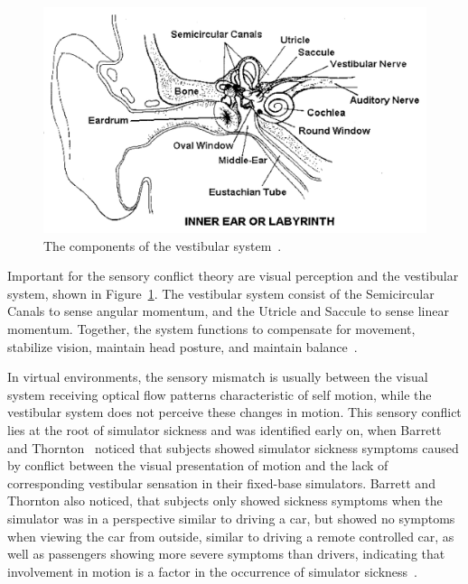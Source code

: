 \begin{figure}[h]
    \centering
    \includegraphics[width=\textwidth]{content/2_2_cybersickness/img/VestibularSystem[LaViola2000]}
    \caption{The components of the vestibular system~\cite{LaViola2000}.}
    \label{fig:vestibular-system}
\end{figure}

Important for the sensory conflict theory are visual perception and the vestibular system, shown in
Figure~\ref{fig:vestibular-system}.
The vestibular system consist of the Semicircular Canals to sense angular momentum, and the Utricle and Saccule to
sense linear momentum.
Together, the system functions to compensate for movement, stabilize vision, maintain head posture, and maintain
balance~\cite{Walker2014}.

In virtual environments, the sensory mismatch is usually between the visual system receiving optical flow patterns
characteristic of self motion, while the vestibular system does not perceive these changes in motion.
This sensory conflict lies at the root of simulator sickness and was identified early on, when Barrett and
Thornton~\cite{Barrett1968} noticed that subjects showed simulator sickness symptoms caused by conflict between the
visual presentation of motion and the lack of corresponding vestibular sensation in their fixed-base simulators.
Barrett and Thornton also noticed, that subjects only showed sickness symptoms when the simulator was in a
perspective similar to driving a car, but showed no symptoms when viewing the car from outside, similar to driving a
remote controlled car, as well as passengers showing more severe symptoms than drivers, indicating
that involvement in motion is a factor in the occurrence of simulator sickness~\cite{Tiiro2018,Barrett1968}.

